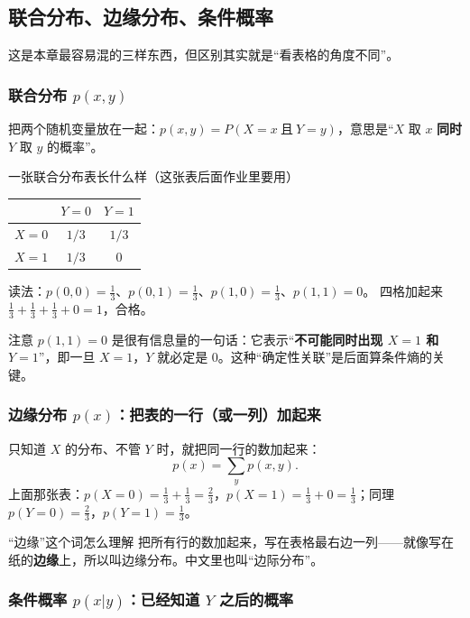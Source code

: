 \subsection{联合分布、边缘分布、条件概率}

这是本章最容易混的三样东西，但区别其实就是“看表格的角度不同”。

\subsubsection*{联合分布 $p(x,y)$}

把两个随机变量放在一起：$p(x,y)=P(X=x\ \text{且}\ Y=y)$，意思是“$X$ 取 $x$ \textbf{同时} $Y$ 取 $y$ 的概率”。

\begin{calc}{一张联合分布表长什么样（这张表后面作业里要用）}
\begin{center}
\renewcommand{\arraystretch}{1.3}
\begin{tabular}{c|cc}
\toprule
 & $Y=0$ & $Y=1$\\
\midrule
$X=0$ & $1/3$ & $1/3$\\
$X=1$ & $1/3$ & $0$\\
\bottomrule
\end{tabular}
\end{center}
读法：$p(0,0)=\frac13$、$p(0,1)=\frac13$、$p(1,0)=\frac13$、$p(1,1)=0$。
四格加起来 $\frac13+\frac13+\frac13+0=1$，合格。

注意 $p(1,1)=0$ 是很有信息量的一句话：它表示“\textbf{不可能同时出现 $X=1$ 和 $Y=1$}”，即一旦 $X=1$，$Y$ 就必定是 0。这种“确定性关联”是后面算条件熵的关键。
\end{calc}

\subsubsection*{边缘分布 $p(x)$：把表的一行（或一列）加起来}

只知道 $X$ 的分布、不管 $Y$ 时，就把同一行的数加起来：
\[
p(x)=\sum_{y}p(x,y).
\]
上面那张表：$p(X=0)=\frac13+\frac13=\frac23$，$p(X=1)=\frac13+0=\frac13$；同理 $p(Y=0)=\frac23$，$p(Y=1)=\frac13$。

\begin{idea}{“边缘”这个词怎么理解}
把所有行的数加起来，写在表格最右边一列——就像写在纸的\textbf{边缘}上，所以叫边缘分布。中文里也叫“边际分布”。
\end{idea}

\subsubsection*{条件概率 $p(x|y)$：已经知道 $Y$ 之后的概率}

